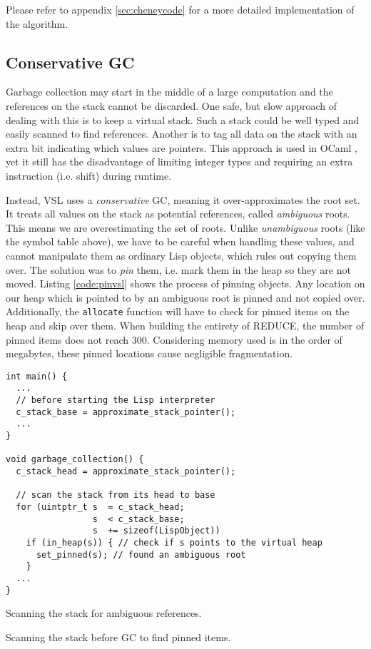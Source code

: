 Please refer to appendix \ref{sec:cheneycode} for a more detailed implementation of the algorithm.

\subsection{Conservative GC}

Garbage collection may start in the middle of a large computation and the references on the stack cannot be discarded.
One safe, but slow approach of dealing with this is to keep a virtual stack. Such a stack could be well typed and easily scanned to find
references. Another is to tag all data on the stack with an extra bit indicating which values are pointers. This approach
is used in OCaml \cite[Chapter~20]{rwoc}, yet it still has the disadvantage of limiting integer types and requiring an extra
instruction (i.e. shift) during runtime.

Instead, VSL uses a \emph{conservative} GC, meaning it over-approximates the root set.
It treats all values on the stack as potential references, called \emph{ambiguous} roots.
This means we are overestimating the set of roots. Unlike \emph{unambiguous} roots (like the symbol table above), we
have to be careful when handling these values, and cannot manipulate them as ordinary Lisp objects, which rules out
copying them over. The solution was
to \emph{pin} them, i.e. mark them in the heap so they are not moved. Listing \ref{code:pinvsl} shows the process of pinning
objects.
Any location on our heap which is pointed to by an ambiguous root is pinned and not copied over.
Additionally, the \texttt{allocate} function will have to check for pinned items on the heap and skip over them.
When building the entirety of REDUCE, the number of pinned items does not reach 300.
Considering memory used is in the order of megabytes, these pinned locations cause negligible fragmentation.

\begin{code}
\begin{verbatim}
int main() {
  ...
  // before starting the Lisp interpreter
  c_stack_base = approximate_stack_pointer();
  ...
}

void garbage_collection() {
  c_stack_head = approximate_stack_pointer();

  // scan the stack from its head to base
  for (uintptr_t s  = c_stack_head;
                 s  < c_stack_base;
                 s  += sizeof(LispObject))
    if (in_heap(s)) { // check if s points to the virtual heap
      set_pinned(s); // found an ambiguous root
    }
  ...
}
\end{verbatim}
\caption{Scanning the stack for ambiguous references.}
\label{fig:scanpinned}
\caption{Scanning the stack before GC to find pinned items.}
\label{code:pinvsl}
\end{code}

